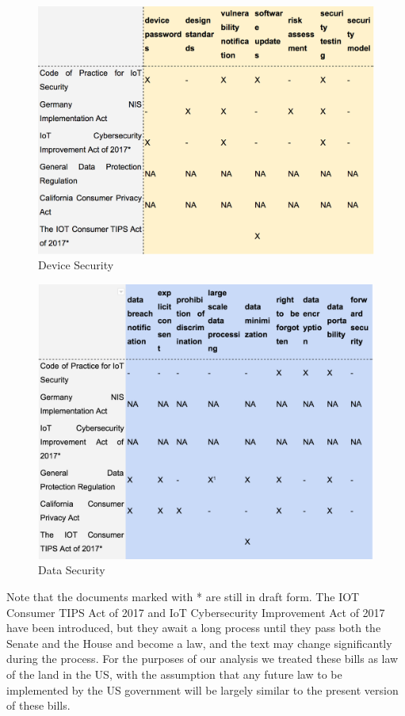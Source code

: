 %
\begin{figure}[h]
	\caption{Device Security}
	\includegraphics[width=1.0\textwidth]{device}
\end{figure}
%
\begin{figure}[h]
	\caption{Data Security}
	\includegraphics[width=1.0\textwidth]{data}
\end{figure}

Note that the documents marked with * are still in draft form. The IOT Consumer TIPS Act of 2017 and IoT Cybersecurity Improvement Act of 2017 have been introduced, but they await a long process until they pass both the Senate and the House and become a law, and the text may change significantly during the process. For the purposes of our analysis we treated these bills as law of the land in the US, with the assumption that any future law to be implemented by the US government will be largely similar to the present version of these bills.

